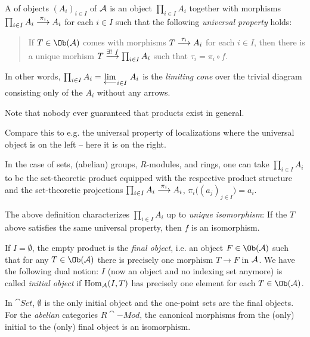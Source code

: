 \documentclass[a4paper,parskip=half,numbers=enddot, DIV=12]{scrreprt}
\begin{document}
  \begin{defi}[Products]
  	A  of objects $(A_i)_{i\in I}$ of $\mathcal{A}$ is an object $\prod_{i\in I}A_i$ together with morphisms $\prod_{i\in I}A_i\morphism[\pi_i]A_i$ for each $i\in I$ such that the following \emph{universal property} holds:
  	\begin{quote}
  		If $T\in\Ob(\Aa)$ comes with morphisms $T\morphism[\tau_i]A_i$ for each $i\in I$, then there is a unique morhism $T\morphism[\exists!\ f]\prod_{i\in I}A_i$ such that $\tau_i=\pi_i\circ f$.
  	\end{quote}
  	In other words, $\prod_{i\in I}A_i=\limit[i\in I]{A_i}$ is the \emph{limiting cone} over the trivial diagram consisting only of the $A_i$ without any arrows.
  \end{defi}
  Note that nobody ever guaranteed that products exist in general.
  \begin{rem*}
  	\begin{alphanumerate}
  		\item Compare this to e.g. the universal property of localizations where the universal object is on the left -- here it is on the right.
  		\item In the case of sets, (abelian) groups, $R$-modules, and rings, one can take $\prod_{i\in I}A_i$ to be the set-theoretic product equipped with the respective product structure and the set-theoretic projections $\prod_{i\in I}A_i\morphism[\pi_i]A_i$, $\pi_i\big((a_j)_{j\in I}\big)=a_i$.
  		\item The above definition characterizes $\prod_{i\in I}A_i$ up to \emph{unique isomorphism}: If the $T$ above satisfies the same universal property, then $f$ is an isomorphism.
  		\item If $I=\emptyset$, the empty product is the \emph{final object}, i.e. an object $F\in\Ob(\Aa)$ such that for any $T\in\Ob(\Aa)$ there is precisely one morphism $T\to F$ in $\mathcal{A}$. We have the following dual notion: $I$ (now an object and no indexing set anymore) is called \emph{initial object} if $\operatorname{Hom}_{\mathcal{A}}(I,T)$ has precisely one element for each $T\in\Ob(\Aa)$.
  	\end{alphanumerate}
  \end{rem*}
  \begin{rem*}
  	In $\cat{Set}$, $\emptyset$ is the only initial object and the one-point sets are the final objects. For the \emph{abelian} categories $R\cat{-Mod}$, the canonical morphisms from the (only) initial to the (only) final object is an isomorphism.
  \end{rem*}
\end{document}
